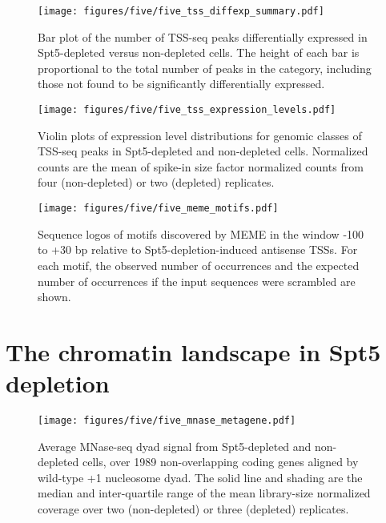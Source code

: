 \begin{figure}[h]
    \centering
    \begin{minipage}[t]{2.875in}
        \centering
        \texttt{[image: figures/five/five\_tss\_diffexp\_summary.pdf]}
        \caption[Bar plot of the number of TSS-seq peaks in various genomic classes differentially expressed in Spt5 depleted versus non-depleted cells.]{Bar plot of the number of TSS-seq peaks differentially expressed in Spt5-depleted versus non-depleted cells. The height of each bar is proportional to the total number of peaks in the category, including those not found to be significantly differentially expressed.}
        \label{fig:five_tss_diffexp_summary}
    \end{minipage}\hfill
    \begin{minipage}[t]{2.875in}
        \centering
        \texttt{[image: figures/five/five\_tss\_expression\_levels.pdf]}
        \caption[Violin plots of expression level distributions for genomic classes of TSS-seq peaks in Spt5-depleted and non-depleted cells.]{Violin plots of expression level distributions for genomic classes of TSS-seq peaks in Spt5-depleted and non-depleted cells. Normalized counts are the mean of spike-in size factor normalized counts from four (non-depleted) or two (depleted) replicates.}
        \label{fig:five_tss_expression_levels}
    \end{minipage}
\end{figure}

\begin{figure}[h]
    \centering
    \texttt{[image: figures/five/five\_meme\_motifs.pdf]}
    \caption[Sequence logos of motifs discovered by MEME upstream of Spt5-depletion-induced antisense TSSs.]{Sequence logos of motifs discovered by MEME \citep{bailey2015} in the window -100 to +30 bp relative to Spt5-depletion-induced antisense TSSs. For each motif, the observed number of occurrences and the expected number of occurrences if the input sequences were scrambled are shown.}
    \label{fig:five_meme_motifs}
\end{figure}

\clearpage

\section{The chromatin landscape in Spt5 depletion}

\begin{wrapfigure}[15]{r}{3in}
    \texttt{[image: figures/five/five\_mnase\_metagene.pdf]}
    \caption[Average MNase-seq dyad signal from Spt5 depleted and non-depleted cells, over non-overlapping coding genes.]{Average MNase-seq dyad signal from Spt5-depleted and non-depleted cells, over 1989 non-overlapping coding genes aligned by wild-type +1 nucleosome dyad. The solid line and shading are the median and inter-quartile range of the mean library-size normalized coverage over two (non-depleted) or three (depleted) replicates.}
    \label{fig:five_mnase_metagene}
\end{wrapfigure}


